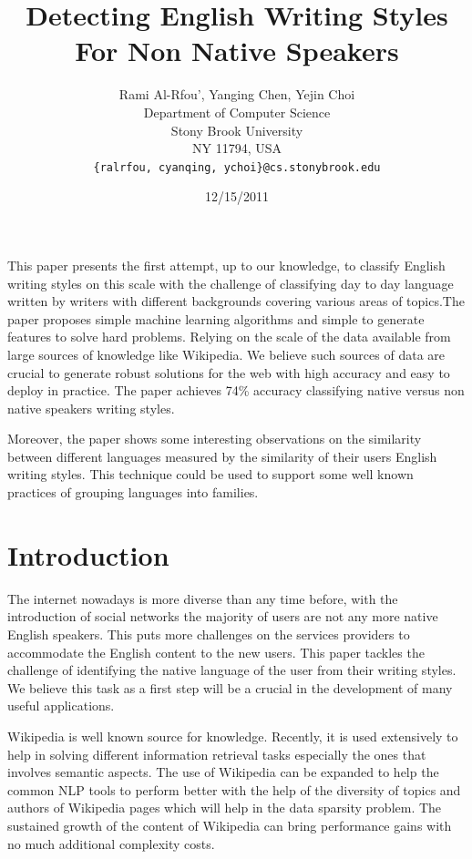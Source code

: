 \documentclass[11pt]{article}
\title{Detecting English Writing Styles For Non Native Speakers}
\author{Rami Al-Rfou', Yanging Chen, Yejin Choi \\
  Department of Computer Science \\
  Stony Brook University \\
  NY 11794, USA \\
  {\tt \{ralrfou, cyanqing, ychoi\}@cs.stonybrook.edu}}
\date{12/15/2011}
\begin{document}
\maketitle
\begin{abstract}
\end{abstract}


This paper presents the first attempt, up to our knowledge, to classify English
writing styles on this scale with the challenge of classifying day to day language written by writers with different backgrounds covering various areas of topics.The paper proposes simple machine learning algorithms and simple to generate features to solve hard problems. Relying on the scale of the data available from large sources of knowledge like Wikipedia. We believe such sources of data are crucial to generate robust solutions for the web with high accuracy and easy to deploy in practice. The paper achieves 74\% accuracy classifying native versus non native speakers writing styles.

Moreover, the paper shows some interesting observations on the similarity between different languages measured by the similarity of their users English writing styles. This technique could be used to support some well known practices of grouping languages into families.

\section{Introduction}
The internet nowadays is more diverse than any time before, with the introduction of social networks the majority of users are not any more native English speakers. This puts more challenges on the services providers to accommodate the English content to the new users. This paper tackles the challenge of identifying the native language of the user from their writing styles. We believe this task as a first step will be a crucial in the development of many useful applications.

Wikipedia is well known source for knowledge. Recently, it is used extensively to help in solving different information retrieval tasks especially the ones that involves semantic aspects. The use of Wikipedia can be expanded to help the common NLP tools to perform better with the help of the diversity of topics and authors of Wikipedia pages which will help in the data sparsity problem. The sustained growth of the content of Wikipedia can bring performance gains with no much additional complexity costs.
\end{document}
